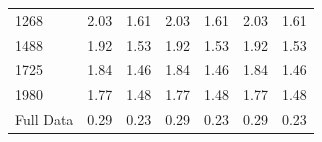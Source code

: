 \begin{table}[!htb]
{\begin{tabular}{l||rr|rr|rr}
    1268        &         2.03 &      1.61 &             2.03 &          1.61 &        2.03 &     1.61 \\
    1488        &         1.92 &      1.53 &             1.92 &          1.53 &        1.92 &     1.53 \\
    1725        &         1.84 &      1.46 &             1.84 &          1.46 &        1.84 &     1.46 \\
    1980        &         1.77 &      1.48 &             1.77 &          1.48 &        1.77 &     1.48 \\
    Full Data       &         0.29 &      0.23 &             0.29 &          0.23 &        0.29 &     0.23 \\
    \bottomrule
    \end{tabular}
    }
    \end{table}

